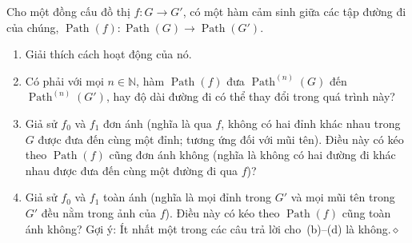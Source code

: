 Cho một đồng cấu đồ thị $f:G\to G'$, có một hàm cảm sinh giữa các tập đường đi của chúng, $\operatorname{Path}(f):\operatorname{Path}(G)\to\operatorname{Path}(G')$.
\begin{enumerate}[label=\alph*.]
\item Giải thích cách hoạt động của nó.
\item Có phải với mọi $n\in\mathbb{N}$, hàm $\operatorname{Path}(f)$ đưa $\operatorname{Path}^{(n)}(G)$ đến $\operatorname{Path}^{(n)}(G')$, hay độ dài đường đi có thể thay đổi trong quá trình này?
\item Giả sử $f_0$ và $f_1$ đơn ánh (nghĩa là qua $f$, không có hai đỉnh khác nhau trong $G$ được đưa đến cùng một đỉnh; tương ứng đối với mũi tên). Điều này có kéo theo $\operatorname{Path}(f)$ cũng đơn ánh không (nghĩa là không có hai đường đi khác nhau được đưa đến cùng một đường đi qua $f$)?
\item Giả sử $f_0$ và $f_1$ toàn ánh (nghĩa là mọi đỉnh trong $G'$ và mọi mũi tên trong $G'$ đều nằm trong ảnh của $f$). Điều này có kéo theo $\operatorname{Path}(f)$ cũng toàn ánh không? Gợi ý: Ít nhất một trong các câu trả lời cho~(b)--(d) là không.\nobreak\hfill$\diamond$
\end{enumerate}

